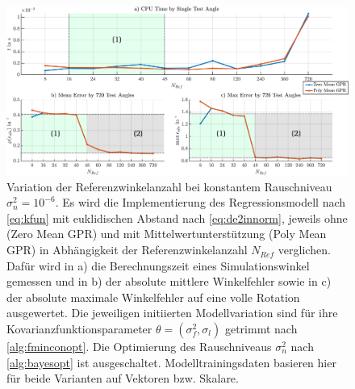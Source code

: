 \clearpage
\begin{figure}[tph]
	\centering
	\includegraphics[width=\linewidth]{chapters/images/4-EuOExp/Timings-vs-Errors}
	\caption[Variation der Referenzwinkelanzahl bei konstantem Rauschniveau]{Variation der Referenzwinkelanzahl bei konstantem Rauschniveau $\sigma_n^2 = 10^{-6}$. Es wird die Implementierung des Regressionsmodell nach \autoref{eq:kfun} mit euklidischen Abstand nach \autoref{eq:de2innorm}, jeweils ohne (Zero Mean GPR) und mit Mittelwertunterstützung (Poly Mean GPR) in Abhängigkeit der Referenzwinkelanzahl $N_{Ref}$ verglichen. Dafür wird in a) die Berechnungszeit eines Simulationswinkel gemessen und in b) der absolute mittlere Winkelfehler sowie in c) der absolute maximale Winkelfehler auf eine volle Rotation ausgewertet. Die jeweiligen initiierten Modellvariation sind für ihre Kovarianzfunktionsparameter $\theta = (\sigma_f^2,\sigma_l)$ getrimmt nach \autoref{alg:fminconopt}. Die Optimierung des Rauschniveaus $\sigma_n^2$ nach \autoref{alg:bayesopt} ist ausgeschaltet. Modelltrainingsdaten basieren hier für beide Varianten auf Vektoren bzw. Skalare.}
	\label{fig:timings-vs-errors}
\end{figure}


\clearpage

